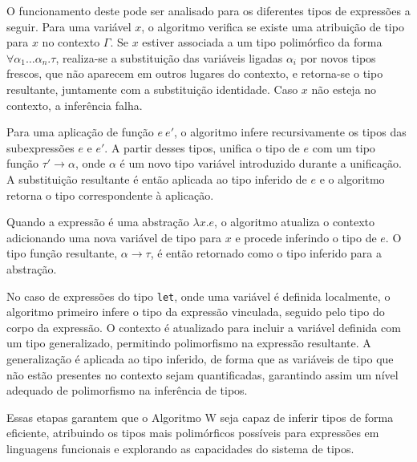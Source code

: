 O funcionamento deste pode ser analisado para os diferentes tipos de expressões a seguir.
Para uma variável $x$, o algoritmo verifica se existe uma atribuição de tipo para $x$ no contexto $\Gamma$.
Se $x$ estiver associada a um tipo polimórfico da forma $\forall \alpha_1 \ldots \alpha_n . \tau$, realiza-se a substituição das variáveis ligadas $\alpha_i$ por novos tipos frescos, que não aparecem em outros lugares do contexto, e retorna-se o tipo resultante, juntamente com a substituição identidade.
Caso $x$ não esteja no contexto, a inferência falha.

Para uma aplicação de função $e\ e'$, o algoritmo infere recursivamente os tipos das subexpressões $e$ e $e'$.
A partir desses tipos, unifica o tipo de $e$ com um tipo função $\tau' \to \alpha$, onde $\alpha$ é um novo tipo variável introduzido durante a unificação.
A substituição resultante é então aplicada ao tipo inferido de $e$ e o algoritmo retorna o tipo correspondente à aplicação.

Quando a expressão é uma abstração $\lambda x . e$, o algoritmo atualiza o contexto adicionando uma nova variável de tipo para $x$ e procede inferindo o tipo de $e$.
O tipo função resultante, $\alpha \to \tau$, é então retornado como o tipo inferido para a abstração.

No caso de expressões do tipo \texttt{let}, onde uma variável é definida localmente, o algoritmo primeiro infere o tipo da expressão vinculada, seguido pelo tipo do corpo da expressão.
O contexto é atualizado para incluir a variável definida com um tipo generalizado, permitindo polimorfismo na expressão resultante.
A generalização é aplicada ao tipo inferido, de forma que as variáveis de tipo que não estão presentes no contexto sejam quantificadas, garantindo assim um nível adequado de polimorfismo na inferência de tipos.

Essas etapas garantem que o Algoritmo W seja capaz de inferir tipos de forma eficiente, atribuindo os tipos mais polimórficos possíveis para expressões em linguagens funcionais e explorando as capacidades do sistema de tipos.
